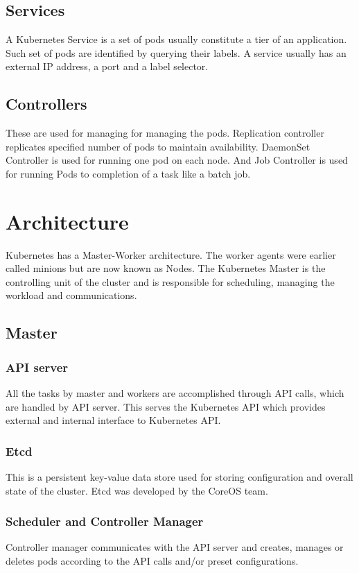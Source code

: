 \documentclass[9pt,twocolumn,twoside]{styles/osajnl}
\begin{document}
\subsection{Services}
A Kubernetes Service is a set of pods usually constitute a tier of an application. Such set of pods are identified by querying their labels. A service usually has an external IP address, a port and a label selector.

\subsection{Controllers}
 These are used for managing for managing the pods. Replication controller replicates specified number of pods to maintain availability. DaemonSet Controller is used for running one pod on each node. And Job Controller is used for running Pods to completion of a task like a batch job.

\section{Architecture}

Kubernetes has a Master-Worker architecture. The worker agents were earlier called minions but are now known as Nodes.
The Kubernetes Master is the controlling unit of the cluster and is responsible for scheduling, managing the workload and communications.\cite{www-kubernetesebook}



\subsection{Master}
\subsubsection{API server}
All the tasks by master and workers are accomplished through API calls, which are handled by API server. This serves the Kubernetes API which provides external and internal interface to Kubernetes API. 
\subsubsection{Etcd}
This is a persistent key-value data store used for storing configuration and overall state of the cluster. Etcd was developed by the CoreOS team.

\subsubsection{Scheduler and Controller Manager}
Controller manager communicates with the API server and creates, manages or deletes pods according to the API calls and/or preset configurations.\cite{www-kuberneteswiki}
\end{document}
